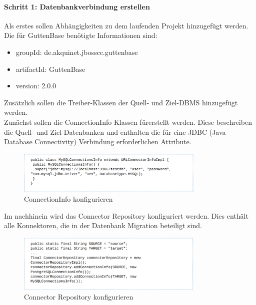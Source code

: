 	\paragraph*{Schritt 1: Datenbankverbindung erstellen}
	Als erstes sollen Abhängigkeiten zu dem laufenden Projekt hinzugefügt werden. Die für GuttenBase benötigte Informationen sind:
	\begin{itemize}
		\item groupId: de.akquinet.jbosscc.guttenbase
		\item artifactId: GuttenBase
		\item version: 2.0.0
	\end{itemize}
	Zusätzlich sollen die Treiber-Klassen der Quell- und Ziel-DBMS hinzugefügt werden.\\
	Zunächst sollen die ConnectionInfo Klassen fürerstellt werden. Diese beschreiben die Quell- und Ziel-Datenbanken und enthalten die für eine JDBC (Java Database Connectivity) Verbindung erforderlichen Attribute.\\
	\begin{figure}[H]
		\centering
		\includegraphics[width=0.8\textwidth]{images/gb/conInfo}
		\caption{ConnectionInfo konfigurieren}
		\label{img:gb/conInfo}
	\end{figure}
	
	Im nachhinein wird das Connector Repository konfiguriert werden. Dies enthält alle Konnektoren, die in der Datenbank Migration beteiligt sind. \\
	\begin{figure}[H]
		\centering
		\includegraphics[width=0.8\textwidth]{images/gb/repo}
		\caption{Connector Repository konfigurieren}
		\label{img:gb/repo}
	\end{figure}
	

